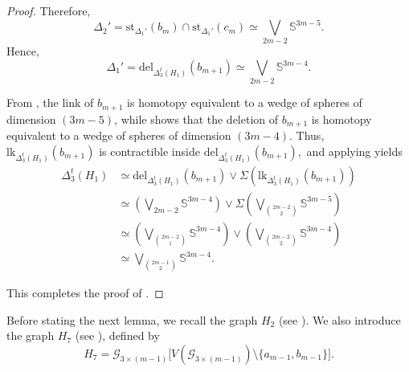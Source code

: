 \documentclass[11pt,reqno,a4paper]{amsart}
\theoremstyle{definition}
\theoremstyle{theorem}
\newcommand{\totalthreecut}{\Delta_{3}^t}
\newcommand{\lno}{\left(}
\newcommand{\rno}{\right)}
\newcommand{\bbS}{\mathbb{S}}
\newcommand{\lk}{\mathrm{lk}}
\newcommand{\del}{\mathrm{del}}
\newcommand{\st}{\mathrm{st}}
\theoremstyle{remark}
\begin{document}
\begin{proof}
Therefore,
\[
    \Delta_2' 
    = 
    \st_{\Delta_1'}\lno b_m \rno 
      \cap 
      \st_{\Delta_1'}\lno c_m \rno
    \simeq 
    \bigvee_{2m-2} \bbS^{3m-5}.
\]
Hence,
\begin{equation}\label{deletion of b_(n+1)}
    \Delta_1' 
    = 
    \del_{\totalthreecut \lno H_1 \rno}\lno b_{m+1} \rno
    \simeq 
    \bigvee_{2m-2} \bbS^{3m-4}.
\end{equation}

From , the link of $b_{m+1}$ is homotopy equivalent to a wedge of spheres of dimension $(3m-5)$, while  shows that the deletion of $b_{m+1}$ is homotopy equivalent to a wedge of spheres of dimension $(3m-4)$.  
Thus, $\lk_{\totalthreecut \lno H_1 \rno}\lno b_{m+1} \rno$ is contractible inside $\del_{\totalthreecut \lno H_1 \rno}\lno b_{m+1} \rno,$ 
and applying  yields
\begin{align*}
    \totalthreecut \lno H_1 \rno 
        &\simeq 
        \del_{\totalthreecut \lno H_1 \rno}\lno b_{m+1} \rno 
        \vee 
        \Sigma \lno 
            \lk_{\totalthreecut \lno H_1 \rno}\lno b_{m+1} \rno
        \rno \\
        &\simeq 
        \left( \bigvee_{2m-2} \bbS^{3m-4} \right)
        \vee 
        \Sigma \left( \bigvee_{\binom{2m-2}{2}} \bbS^{3m-5} \right) \\
        &\simeq 
        \left( \bigvee_{\binom{2m-2}{1}}\bbS^{3m-4} \right)
        \vee 
        \left( \bigvee_{\binom{2m-2}{2}}\bbS^{3m-4} \right) \\
        &\simeq 
        \bigvee_{\binom{2m-1}{2}} \bbS^{3m-4}.
\end{align*}

This completes the proof of 
.
\end{proof}

Before stating the next lemma, we recall the graph $H_2$ (see ). 
We also introduce the graph $H_7$ (see ), defined by
\[
    H_7 
    = 
    \mathcal{G}_{3 \times (m-1)}
    \bigl[
        V\lno \mathcal{G}_{3 \times (m-1)} \rno 
        \setminus 
        \{a_{m-1}, b_{m-1}\}
    \bigr].
\]
\end{document}
